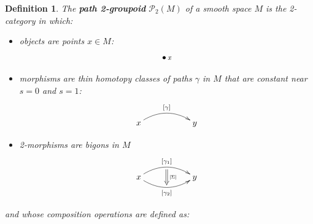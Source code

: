 \documentclass{article}
\renewcommand{\P}{\mathcal{P}}
\newtheorem{definition}[theorem]{Definition}
\newcommand{\et}{\hspace{-0.08in}{\bf .}\hspace{0.1in}}
\def\of #1{\!\left({#1}\right)}
\begin{document}
\begin{definition} \et
\label{2-groupoid of bigons}
  The {\bf path 2-groupoid} 
  $\P_2\of{M}$
  of a smooth space $M$ is the 2-category in which:
  \begin{itemize}
    \item 
      objects are points $x \in M$:
      \[   \bullet \, {\textstyle{\small{\textit{x}}}}  
      \] 
    \item 
      morphisms are thin homotopy classes of paths $\gamma$ in
      $M$ that are constant near $s = 0$ and $s = 1$: 
     \[
      \xymatrix{
       x \ar@/^1pc/[rr]^{[\gamma]} 
       && y 
      }
      \]
    \item
      2-morphisms are bigons in $M$
 \[
\xymatrix{
   x \ar@/^1pc/[rr]^{[\gamma_1]}_{}="0"
           \ar@/_1pc/[rr]_{[\gamma_2]}_{}="1"
           \ar@{=>}"0";"1"^{{}_{[\Sigma]}}
&& y
}
\]
  \end{itemize}
and whose composition operations are defined as:
\end{definition}
\end{document}
